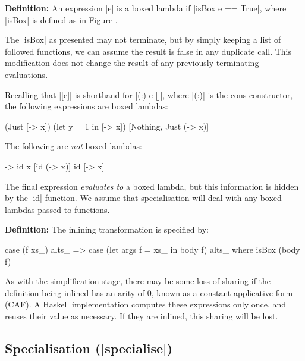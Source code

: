 \documentclass[preprint]{sigplanconf}
\newenvironment{definition}
    {\textbf{Definition:}}
    {\noexample}
\begin{document}
\begin{definition}
An expression |e| is a boxed lambda if |isBox e == True|, where |isBox| is defined as in Figure \label{fig:boxed_lambda}.
\end{definition}

The |isBox| as presented may not terminate, but by simply keeping a list of followed functions, we can assume the result is false in any duplicate call. This modification does not change the result of any previously terminating evaluations.

\begin{example}
Recalling that |[e]| is shorthand for |(:) e []|, where |(:)| is the cons constructor, the following expressions are boxed lambdas:

\ignore\begin{code}
[\x -> x]
(Just [\x -> x])
(let y = 1 in [\x -> x])
[Nothing, Just (\x -> x)]
\end{code}

The following are \textit{not} boxed lambdas:

\ignore\begin{code}
\x -> id x
[id (\x -> x)]
id [\x -> x]
\end{code}

The final expression \textit{evaluates to} a boxed lambda, but this information is hidden by the |id| function. We assume that specialisation will deal with any boxed lambdas passed to functions.
\end{example}

\begin{definition}
The inlining transformation is specified by:

\ignore\begin{code}
case (f xs_) alts_
    => case (let args f = xs_ in body f) alts_
    where isBox (body f)
\end{code}
\end{definition}

As with the simplification stage, there may be some loss of sharing if the definition being inlined has an arity of 0, known as a constant applicative form (CAF). A Haskell implementation computes these expressions only once, and reuses their value as necessary. If they are inlined, this sharing will be lost.

\subsection{Specialisation (|specialise|)}
\end{document}
